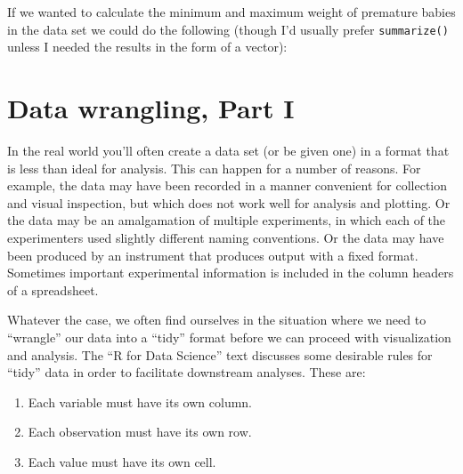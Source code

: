 \documentclass[]{book}
\newenvironment{Shaded}{\begin{snugshade}}{\end{snugshade}}
\newcommand{\CommentTok}[1]{\textcolor[rgb]{0.56,0.35,0.01}{\textit{#1}}}
\newcommand{\DecValTok}[1]{\textcolor[rgb]{0.00,0.00,0.81}{#1}}
\newcommand{\KeywordTok}[1]{\textcolor[rgb]{0.13,0.29,0.53}{\textbf{#1}}}
\newcommand{\NormalTok}[1]{#1}
\newcommand{\OperatorTok}[1]{\textcolor[rgb]{0.81,0.36,0.00}{\textbf{#1}}}
\newcommand{\StringTok}[1]{\textcolor[rgb]{0.31,0.60,0.02}{#1}}
\providecommand{\tightlist}{%
  \setlength{\itemsep}{0pt}\setlength{\parskip}{0pt}}
\theoremstyle{definition}
\theoremstyle{definition}
\theoremstyle{definition}
\theoremstyle{remark}
\begin{document}
If we wanted to calculate the minimum and maximum weight of premature
babies in the data set we could do the following (though I'd usually
prefer \texttt{summarize()} unless I needed the results in the form of a
vector):

\begin{Shaded}
\end{Shaded}

\hypertarget{data-wrangling-part-i}{%
\chapter{Data wrangling, Part I}\label{data-wrangling-part-i}}

In the real world you'll often create a data set (or be given one) in a
format that is less than ideal for analysis. This can happen for a
number of reasons. For example, the data may have been recorded in a
manner convenient for collection and visual inspection, but which does
not work well for analysis and plotting. Or the data may be an
amalgamation of multiple experiments, in which each of the experimenters
used slightly different naming conventions. Or the data may have been
produced by an instrument that produces output with a fixed format.
Sometimes important experimental information is included in the column
headers of a spreadsheet.

Whatever the case, we often find ourselves in the situation where we
need to ``wrangle'' our data into a ``tidy'' format before we can
proceed with visualization and analysis. The ``R for Data Science'' text
discusses some desirable rules for ``tidy'' data in order to facilitate
downstream analyses. These are:

\begin{enumerate}
\def\labelenumi{\arabic{enumi}.}
\tightlist
\item
  Each variable must have its own column.
\item
  Each observation must have its own row.
\item
  Each value must have its own cell.
\end{enumerate}
\end{document}
